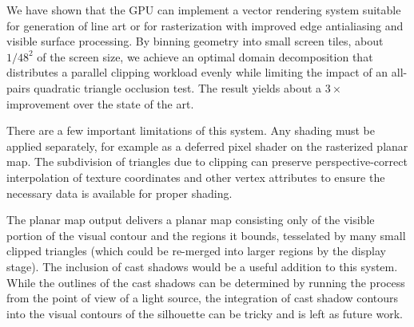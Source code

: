 \documentclass[review]{acmsiggraph}
\begin{document}
We have shown that the GPU can implement a vector rendering system suitable
for generation of line art or for rasterization with improved edge
antialiasing and visible surface processing. By binning geometry into small
screen tiles, about $1/48^2$ of the screen size, we achieve an optimal domain
decomposition that distributes a parallel clipping workload evenly while
limiting the impact of an all-pairs quadratic triangle occlusion test. The
result yields about a $3\times$ improvement over the state of the art.

There are a few important limitations of this system. Any shading must be
applied separately, for example as a deferred pixel shader on the rasterized
planar map. The subdivision of triangles due to clipping can preserve
perspective-correct interpolation of texture coordinates and other vertex
attributes to ensure the necessary data is available for proper shading.

The planar map output delivers a planar map consisting only of the visible
portion of the visual contour and the regions it bounds, tesselated by many
small clipped triangles (which could be re-merged into larger regions by the
display stage). The inclusion of cast shadows would be a useful addition to
this system. While the outlines of the cast shadows can be determined by
running the process from the point of view of a light source, the integration
of cast shadow contours into the visual contours of the silhouette can be
tricky and is left as future work.



\end{document}
